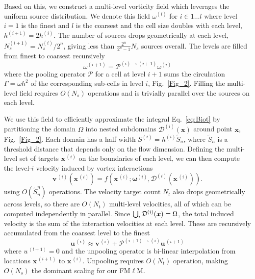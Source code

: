 \documentclass[lineno]{JFM-FLM_Au}
\begin{document}
Based on this, we construct a multi-level vorticity field which leverages the uniform source distribution. We denote this field $\omega^{(i)}$ for $i\in 1\ldots l$ where level $i=1$ is the finest and $l$ is the coarsest and the cell size doubles with each level, $h^{(i+1)}=2h^{(i)}$. The number of sources drops geometrically at each level, $N_s^{(i+1)}=N_s^{(i)}/2^n$, giving less than $\frac{2^n}{2^n-1} N_s$ sources overall. The levels are filled from finest to coarsest recursively 
\begin{equation}
    \omega^{(i+1)}=\mathcal{P}^{(i)\to(i+1)}\omega^{(i)}
\end{equation}
where the pooling operator $\mathcal{P}$ for a cell at level $i+1$ sums the circulation $\Gamma=\omega h^2$ of the corresponding sub-cells in level $i$, Fig.~\ref{Fig_2}. Filling the multi-level field requires $O(N_s)$ operations and is trivially parallel over the sources on each level.

We use this field to efficiently approximate the integral Eq.~\ref{eq:Biot} by partitioning the domain $\Omega$ into nested subdomains $\mathcal{D}^{(i)}(\bm x)$ around point $\bm x$, Fig.~\ref{Fig_2}. Each domain has a half-width $S^{(i)}=h^{(i)}\tilde S_n$, where $\tilde S_n$ is a threshold distance that depends only on the flow dimension. Defining the multi-level set of targets $\bm  x^{\,(i)}$ on the boundaries of each level, we can then compute the level-$i$ velocity induced by vortex interactions 
\begin{equation}\label{eq:interaction}
    \bm v^{\,(i)}(\bm x^{\,(i)}) = f(\bm x^{\,(i)}; \bm \omega^{(i)},\mathcal{D}^{(i)}(\bm x^{\,(i)})).
\end{equation}
using $O(\tilde S_n^n)$ operations. The velocity target count $N_t$ also drops geometrically across levels, so there are $O(N_t)$ multi-level velocities, all of which can be computed independently in parallel.
Since $\bigcup_i {\cal D}^{(i)}(\bm x)= \Omega$, the total induced velocity is the sum of the interaction velocities at each level. These are recursively accumulated from the coarsest level to the finest
\begin{equation}\label{eq:unpool}
    \bm u^{\,(i)} \approx \bm v^{\,(i)}+\mathcal{P}^{(i+1)\to(i)} \bm u^{\,(i+1)}
\end{equation}
where $u^{\,(l+1)}=0$ and the unpooling operator is bi-linear interpolation from locations $\bm x^{\,(i+1)}$ to  $\bm x^{\,(i)}$. Unpooling requires $O(N_t)$ operation, making $O(N_s)$ the dominant scaling for our FM$\ell$M.
\end{document}
